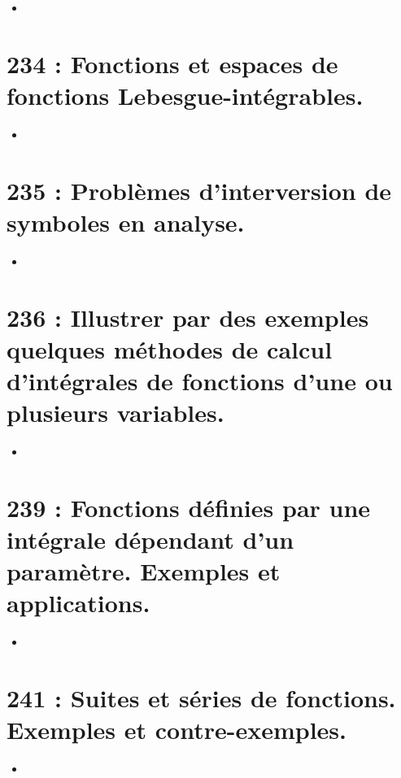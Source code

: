\documentclass[a4paper,10pt,oneside,twocolumn,landscape]{book}
\begin{document}
\begin{itemize}
	\item 
\end{itemize}

\section{234 : Fonctions et espaces de fonctions Lebesgue-intégrables.}

\begin{itemize}
	\item 
\end{itemize}

\section{235 : Problèmes d’interversion de symboles en analyse.}

\begin{itemize}
	\item 
\end{itemize}

\section{236 : Illustrer par des exemples quelques méthodes de calcul d’intégrales de fonctions d’une ou plusieurs variables.}

\begin{itemize}
	\item 
\end{itemize}

\section{239 : Fonctions définies par une intégrale dépendant d’un paramètre. Exemples et applications.}

\begin{itemize}
	\item 
\end{itemize}

\section{241 : Suites et séries de fonctions. Exemples et contre-exemples.}

\begin{itemize}
	\item 
\end{itemize}
\end{document}
